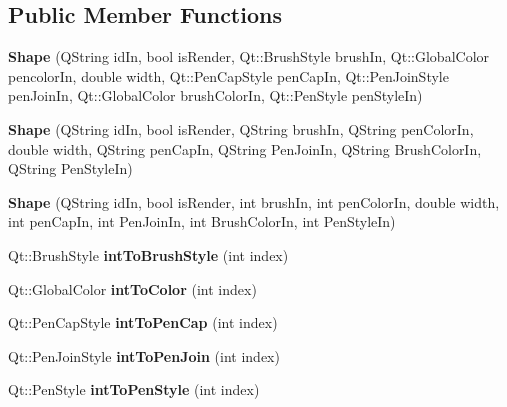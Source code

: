 \subsection*{Public Member Functions}
\begin{DoxyCompactItemize}
\item 
\mbox{\label{class_shape_ab41921d0dd6e4480d9232e2556991863}} 
{\bfseries Shape} (Q\+String id\+In, bool is\+Render, Qt\+::\+Brush\+Style brush\+In, Qt\+::\+Global\+Color pencolor\+In, double width, Qt\+::\+Pen\+Cap\+Style pen\+Cap\+In, Qt\+::\+Pen\+Join\+Style pen\+Join\+In, Qt\+::\+Global\+Color brush\+Color\+In, Qt\+::\+Pen\+Style pen\+Style\+In)
\item 
\mbox{\label{class_shape_ae7a27992cf927eb09b31ac38b11f1d8d}} 
{\bfseries Shape} (Q\+String id\+In, bool is\+Render, Q\+String brush\+In, Q\+String pen\+Color\+In, double width, Q\+String pen\+Cap\+In, Q\+String Pen\+Join\+In, Q\+String Brush\+Color\+In, Q\+String Pen\+Style\+In)
\item 
\mbox{\label{class_shape_a14489e501cf05219c32ee79e6331d3ef}} 
{\bfseries Shape} (Q\+String id\+In, bool is\+Render, int brush\+In, int pen\+Color\+In, double width, int pen\+Cap\+In, int Pen\+Join\+In, int Brush\+Color\+In, int Pen\+Style\+In)
\item 
\mbox{\label{class_shape_a51e4f98296596a66ed673690267f9849}} 
Qt\+::\+Brush\+Style {\bfseries int\+To\+Brush\+Style} (int index)
\item 
\mbox{\label{class_shape_a63318b91c48c0184a7cc99567768f6eb}} 
Qt\+::\+Global\+Color {\bfseries int\+To\+Color} (int index)
\item 
\mbox{\label{class_shape_ab9a6d3653678500542c6ef83cbf8b68c}} 
Qt\+::\+Pen\+Cap\+Style {\bfseries int\+To\+Pen\+Cap} (int index)
\item 
\mbox{\label{class_shape_a06bbdbf344d0ecdc764ce59b6a95368d}} 
Qt\+::\+Pen\+Join\+Style {\bfseries int\+To\+Pen\+Join} (int index)
\item 
\mbox{\label{class_shape_ad4c0545fbc55a595504dedb0f9d6f6e4}} 
Qt\+::\+Pen\+Style {\bfseries int\+To\+Pen\+Style} (int index)

\end{DoxyCompactItemize}
